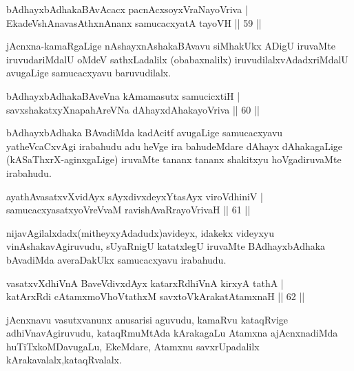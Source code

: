 
\begin{shl}
bAdhayxbAdhakaBAvAcacx pacnAcxsoyxVraNayoVriva |\\
EkadeVshAnavasAthxnAnanx samucacxyatA tayoVH \hfill || 59 ||
\end{shl}

\begin{artha}
jAcnxna-kamaRgaLige nAshayxnAshakaBAvavu siMhakUkx ADigU iruvaMte iruvudariMdalU oMdeV sathxLadalilx (obabaxnalilx) iruvudilalxvAdadxriMdalU avugaLige samucacxyavu baruvudilalx.
\end{artha}

\begin{shl}
bAdhayxbAdhakaBAveVna kAmamasutx samucicxtiH |\\
savxshakatxyXnapahAreVNa dAhayxdAhakayoVriva \hfill || 60 ||
\end{shl}

\begin{artha}
bAdhayxbAdhaka BAvadiMda kadAcitf avugaLige samucacxyavu yatheVcaCxvAgi irabahudu adu heVge ira bahudeMdare dAhayx dAhakagaLige (kASaThxrX-aginxgaLige) iruvaMte tananx tananx shakitxyu hoVgadiruvaMte irabahudu.
\end{artha}

\begin{shl}
ayathAvasatxvXvidAyx sAyxdivxdeyxYtasAyx viroVdhiniV |\\
samucacxyasatxyoVreVvaM ravishAvaRrayoVrivaH \hfill || 61 ||
\end{shl}

\begin{artha}
nijavAgilalxdadx(mitheyxyAdadudx)avideyx, idakekx videyxyu vinAshakavAgiruvudu, sUyaRnigU katatxlegU iruvaMte BAdhayxbAdhaka bAvadiMda averaDakUkx samucacxyavu irabahudu.
\end{artha}

\begin{shl}
vasatxvXdhiVnA BaveVdivxdAyx katarxRdhiVnA kirxyA tathA |\\
katArxRdi cA\s \s tamxmoVhoVtathxM savxtoV\s kArakatA\s \s tamxnaH \hfill || 62 ||
\end{shl}

\begin{artha}
jAcnxnavu vasutxvanunx anusarisi aguvudu, kamaRvu kataqRvige adhiVnavAgiruvudu, kataqRmuMtAda kArakagaLu Atamxna ajAcnxnadiMda huTiTxkoMDavugaLu, EkeMdare, Atamxnu savxrUpadalilx kArakavalalx,\break kataqRvalalx.
\end{artha}

